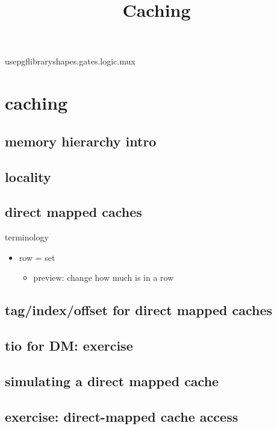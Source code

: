 \graphicspath{{./figures/}}
\title{Caching}
\date{}


usepgflibrary{shapes.gates.logic.mux}

\section{caching}

\subsection{memory hierarchy intro}


\subsection{locality}


\subsection{direct mapped caches}


\begin{frame}{terminology}
    \begin{itemize}
    \item row = set
        \begin{itemize}
        \item preview: change how much is in a row
        \end{itemize}
    \end{itemize}
\end{frame}

\subsection{tag/index/offset for direct mapped caches}


\subsection{tio for DM: exercise}


\subsection{simulating a direct mapped cache}


\subsection{exercise: direct-mapped cache access}


